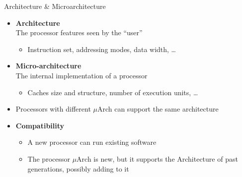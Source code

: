 \documentclass[aspectratio=169,12pt]{beamer}
\begin{document}
\begin{frame}{Architecture \& Microarchitecture}
\begin{itemize}
    \item \textbf{\textcolor{mygreen}{Architecture}}\\
    The processor features seen by the ``user''
    \begin{itemize}
        \item Instruction set, addressing modes, data width, \ldots
    \end{itemize}
    \vspace{0.3cm}
    \item \textbf{\textcolor{myblue}{Micro-architecture}}\\
    The internal implementation of a processor
    \begin{itemize}
        \item Caches size and structure, number of execution units, \ldots
    \end{itemize}
    \vspace{0.3cm}
    \item Processors with different $\mu$Arch can support the same architecture
    \vspace{0.3cm}
    \item \textbf{Compatibility}
    \begin{itemize}
        \item A new processor can run existing software
        \item The processor $\mu$Arch is new, but it supports the Architecture of past generations, possibly adding to it
    \end{itemize}
\end{itemize}
\end{frame}
\end{document}
